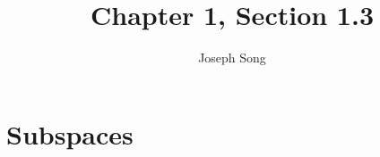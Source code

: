 \documentclass{article}
\title{Chapter 1, Section 1.3}
\author{Joseph Song}
\date{}
\begin{document}
\maketitle

\section{Subspaces}
\end{document}
